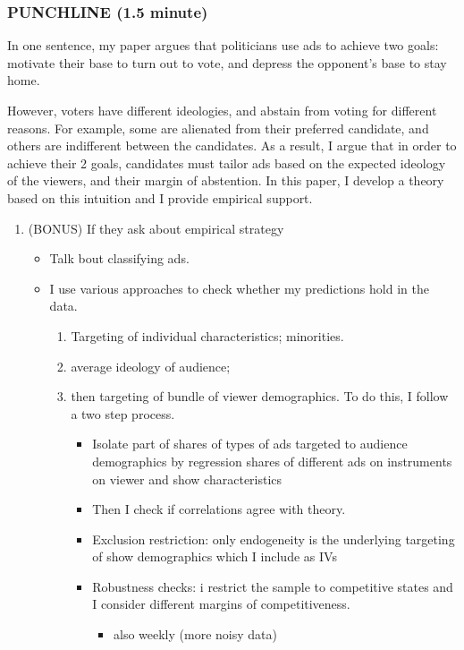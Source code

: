 \documentclass[12pt]{article}
\theoremstyle{plain}
\theoremstyle{plain}
\theoremstyle{plain}
\theoremstyle{plain}
\theoremstyle{plain}
\theoremstyle{plain}
\begin{document}
\subsubsection{PUNCHLINE (1.5 minute)}
\label{sec:orga98024e}

In one sentence, my paper argues that politicians use ads to achieve two goals:
motivate their base to turn out to vote, and
depress the opponent's base to stay home.

However, voters have different ideologies, and abstain from voting for different reasons.
For example, some are alienated from their preferred candidate, and others are indifferent between the candidates.
As a result, I argue that in order to achieve their 2 goals, candidates must tailor ads based on the expected ideology of the viewers,
and their margin of abstention.
In this paper, I develop a theory based on this intuition and I provide empirical support.

\begin{enumerate}
\item (BONUS) If they ask about empirical strategy
\label{sec:org799ce3e}

\begin{itemize}
\item Talk bout classifying ads.
\item I use various approaches to check whether my predictions hold in the data.
\begin{enumerate}
\item Targeting of individual characteristics; minorities.
\item average ideology of audience;
\item then targeting of bundle of viewer demographics.
To do this, I follow a two step process.
\begin{itemize}
\item Isolate part of shares of types of ads targeted to audience demographics
by regression shares of different ads on instruments on viewer and show characteristics
\item Then I check if correlations agree with theory.
\item Exclusion restriction: only endogeneity is the underlying targeting of show demographics which I include as IVs
\item Robustness checks: i restrict the sample to competitive states and I consider different margins of competitiveness.
\begin{itemize}
\item also weekly (more noisy data)
\end{itemize}
\end{itemize}
\end{enumerate}
\end{itemize}

\clearpage
\end{enumerate}
\end{document}
